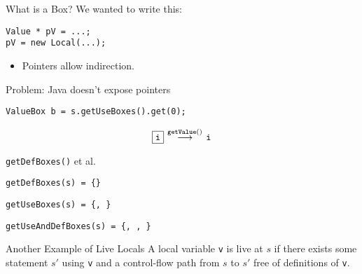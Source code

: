 
\begin{slide}{What is a Box?}
We wanted to write this:

\begin{tabbing}
\qquad \= {\tt Value * pV = ...;}\\
       \> {\tt *pV = new Local(...);}
\end{tabbing}


\vspace*{-0.05in}
\begin{itemize}
\item Pointers allow indirection.
\end{itemize}

Problem: Java doesn't expose pointers

\vspace*{0.05in}
\begin{tabbing}
\quad \= {\tt ValueBox b = s.getUseBoxes().get(0);}\\
\end{tabbing}

\[ \fbox{\tt i} \: \mathop{\longrightarrow}^{\small \tt getValue()} \: \mbox{\tt i} \]

\end{slide}

\begin{slide}{{\tt getDefBoxes()} et al.}

\begin{center}
\end{center}

\quad

{\tt getDefBoxes(s) = \{\}}\\

\quad

{\tt getUseBoxes(s) = \{, \}}\\

\quad

{\tt getUseAndDefBoxes(s) = \{, , \}}\\

\end{slide}

\begin{slide}{Another Example of Live Locals}
A local variable {\tt v} is {\red live} at $s$ if there exists some
statement $s'$ using {\tt v} and a control-flow path from $s$ to $s'$ free
of definitions of {\tt v}.

\quad

\begin{center}

\end{center}
\end{slide}

